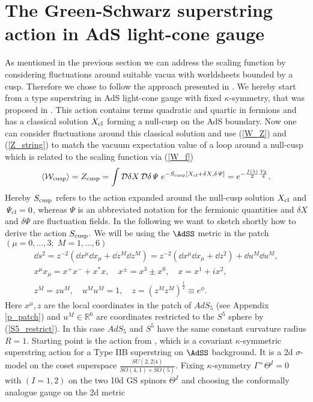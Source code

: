 \section[The GS superstring action in AdS light-cone gauge]{The Green-Schwarz superstring action in AdS light-cone gauge}
As mentioned in the previous section we can address the scaling function by considering fluctuations around suitable vacua with worldsheets bounded by a cusp. Therefore we chose to follow the approach presented in \cite{Giombi:2009gd}. We hereby start from a  type superstring in AdS light-cone gauge with fixed $\kappa$-symmetry, that was proposed in \cite{Metsaev:2000yf,Metsaev:2000yu}. This action contains terms quadratic and quartic in fermions and has a classical solution $X_{\rm cl}$ forming a null-cusp on the AdS boundary. Now one can consider fluctuations around this classical solution and use (\ref{W_Z}) and (\ref{Z_string}) to match the vacuum expectation value of a  loop around a null-cusp which is related to the scaling function via (\ref{W_f})
%
%
\begin{equation}
\langle \mathcal{W}_{\rm cusp} \rangle =Z_{\rm cusp}= \int \mathcal{D}\delta X\, \mathcal{D}\delta \mathit{\Psi}\; e^{-S_{\rm cusp}[X_{\rm cl} + \delta X,\delta \mathit{\Psi}]} = e^{-\frac{f(\lambda)}{2}\frac{V_{2}}{4}}.
\label{eq: W_S_cusp}
\end{equation}
%
%
Hereby $S_{\rm cusp}$ refers to the action expanded around the null-cusp solution $X_{\rm cl}$ and $\mathit{\Psi}_{\rm cl} = 0$, whereas $\mathit{\Psi}$ is an abbreviated notation for the fermionic quantities and $\delta X$ and $\delta\mathit{\Psi}$ are fluctuation fields. In the following we want to sketch shortly how to derive the action $S_{\rm cusp}$. We will be using the $\AdSS$ metric in the  patch $(\mu = 0,\ldots,3; \; M=1,\ldots,6)$
%
%
\begin{gather}
\dd s^{2} = z^{-2}\left( \dd x^{\mu}\dd x_{\mu} + \dd z^{M} \dd z^{M} \right) = z^{-2} \left(\dd x^{\mu}\dd x_{\mu} + \dd z^{2}\right) + \dd u^{M}\dd u^{M}, \\
x^{\mu}x_{\mu} = x^{+}x^{-} + x^{*}x, \quad x^{\pm} = x^{3}\pm x^{0}, \quad  x = x^{1} +ix^{2}, \\
z^{M} = zu^{M}, \quad  u^{M}u^{M} = 1, \quad  z=\left(z^{M}z^{M}\right)^{\frac{1}{2}} \equiv e^{\phi}. \label{S5_restrict}
\end{gather}
%
%
Here $x^{\mu},z$ are the local coordinates in the  patch of $AdS_{5}$ (see Appendix \ref{p_patch}) and $u^{M}\in \mathbb{R}^{6}$ are  coordinates restricted to the $S^{5}$ sphere by (\ref{S5_restrict}). In this case $AdS_{5}$ and $S^{5}$ have the same constant curvature radius $R=1$. Starting point is the action from \cite{Metsaev:1998it}, which is a covariant $\kappa$-symmetric superstring action for a Type IIB superstring on $\AdSS$ background. It is a 2d $\sigma$-model on the coset superspace $\frac{SU(2,2\vert 4)}{SO(4,1)\times SO(5)}$. Fixing $\kappa$-symmetry $\Gamma^{+}\mathit{\Theta}^{I}=0$ with $(I=1,2)$ on the two 10d  GS spinors $\mathit{\Theta}^{I}$  and choosing the conformally analogue gauge on the 2d metric
